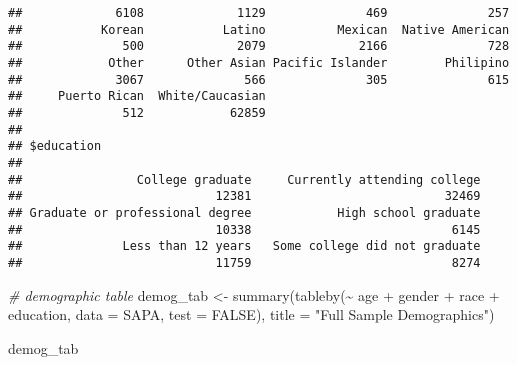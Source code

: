 \documentclass[
]{article}
\newenvironment{Shaded}{\begin{snugshade}}{\end{snugshade}}
\newcommand{\AttributeTok}[1]{\textcolor[rgb]{0.77,0.63,0.00}{#1}}
\newcommand{\CommentTok}[1]{\textcolor[rgb]{0.56,0.35,0.01}{\textit{#1}}}
\newcommand{\ConstantTok}[1]{\textcolor[rgb]{0.00,0.00,0.00}{#1}}
\newcommand{\DecValTok}[1]{\textcolor[rgb]{0.00,0.00,0.81}{#1}}
\newcommand{\FunctionTok}[1]{\textcolor[rgb]{0.00,0.00,0.00}{#1}}
\newcommand{\NormalTok}[1]{#1}
\newcommand{\OtherTok}[1]{\textcolor[rgb]{0.56,0.35,0.01}{#1}}
\newcommand{\SpecialCharTok}[1]{\textcolor[rgb]{0.00,0.00,0.00}{#1}}
\newcommand{\StringTok}[1]{\textcolor[rgb]{0.31,0.60,0.02}{#1}}
\begin{document}
\begin{verbatim}
##             6108             1129              469              257 
##           Korean           Latino          Mexican  Native American 
##              500             2079             2166              728 
##            Other      Other Asian Pacific Islander        Philipino 
##             3067              566              305              615 
##     Puerto Rican  White/Caucasian 
##              512            62859 
## 
## $education
## 
##                College graduate     Currently attending college 
##                           12381                           32469 
## Graduate or professional degree            High school graduate 
##                           10338                            6145 
##              Less than 12 years   Some college did not graduate 
##                           11759                            8274
\end{verbatim}

\begin{Shaded}
\end{Shaded}

\begin{Shaded}
\begin{Highlighting}[]
\CommentTok{\# demographic table}
\NormalTok{demog\_tab }\OtherTok{\textless{}{-}} \FunctionTok{summary}\NormalTok{(}\FunctionTok{tableby}\NormalTok{(}\SpecialCharTok{\textasciitilde{}}\NormalTok{ age }\SpecialCharTok{+}\NormalTok{ gender }\SpecialCharTok{+}\NormalTok{ race }\SpecialCharTok{+}\NormalTok{ education, }
                             \AttributeTok{data =}\NormalTok{ SAPA, }\AttributeTok{test =} \ConstantTok{FALSE}\NormalTok{),  }
                     \AttributeTok{title =} \StringTok{"Full Sample Demographics"}\NormalTok{)}

\NormalTok{demog\_tab}
\end{Highlighting}
\end{Shaded}
\end{document}

